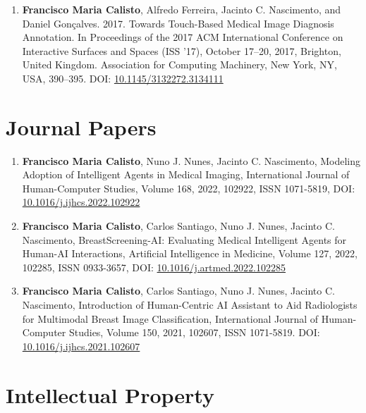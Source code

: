 \begin{enumerate}
\item {\bf Francisco Maria Calisto}, Alfredo Ferreira, Jacinto C. Nascimento, and Daniel Gon\c{c}alves. 2017. Towards Touch-Based Medical Image Diagnosis Annotation. In Proceedings of the 2017 ACM International Conference on Interactive Surfaces and Spaces (ISS '17), October 17--20, 2017, Brighton, United Kingdom. Association for Computing Machinery, New York, NY, USA, 390–395. DOI: \href{https://doi.org/10.1145/3132272.3134111}{10.1145/3132272.3134111}
\end{enumerate}

\section*{Journal Papers}
\label{sec:chap00100602}

\begin{enumerate}
\item {\bf Francisco Maria Calisto}, Nuno J. Nunes, Jacinto C. Nascimento, Modeling Adoption of Intelligent Agents in Medical Imaging, International Journal of Human-Computer Studies, Volume 168, 2022, 102922, ISSN 1071-5819, DOI: \href{https://doi.org/10.1016/j.ijhcs.2022.102922}{10.1016/j.ijhcs.2022.102922}
\item {\bf Francisco Maria Calisto}, Carlos Santiago, Nuno J. Nunes, Jacinto C. Nascimento, BreastScreening-AI: Evaluating Medical Intelligent Agents for Human-AI Interactions, Artificial Intelligence in Medicine, Volume 127, 2022, 102285, ISSN 0933-3657, DOI: \href{https://doi.org/10.1016/j.artmed.2022.102285}{10.1016/j.artmed.2022.102285}
\item {\bf Francisco Maria Calisto}, Carlos Santiago, Nuno J. Nunes, Jacinto C. Nascimento, Introduction of Human-Centric AI Assistant to Aid Radiologists for Multimodal Breast Image Classification, International Journal of Human-Computer Studies, Volume 150, 2021, 102607, ISSN 1071-5819. DOI: \href{https://doi.org/10.1016/j.ijhcs.2021.102607}{10.1016/j.ijhcs.2021.102607}
\end{enumerate}

\section*{Intellectual Property}
\label{sec:chap00100603}

